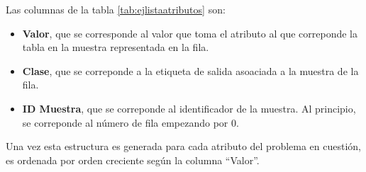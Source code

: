 Las columnas de la tabla \ref{tab:ejlistaatributos} son:
\begin{itemize}
	\item \textbf{Valor}, que se corresponde al valor que toma el atributo al que correponde la tabla en la muestra representada en la fila.
	\item \textbf{Clase}, que se correponde a la etiqueta de salida asoaciada a la muestra de la fila.
	\item \textbf{ID Muestra}, que se correponde al identificador de la muestra. Al principio, se correponde al número de fila empezando por 0.
\end{itemize}

Una vez esta estructura es generada para cada atributo del problema en cuestión, es ordenada por orden creciente según la columna ``Valor''.


